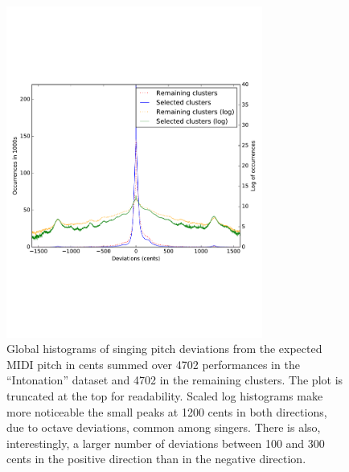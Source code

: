 \begin{figure}[h!]
    \centering
    \includegraphics[width=0.75\textwidth]{figures/full_histograms_comparison.pdf}\vspace{-1in}
    \caption{Global histograms of singing pitch deviations from the expected MIDI pitch in cents summed over 4702 performances in the ``Intonation'' dataset and 4702 in the remaining clusters. The plot is truncated at the top for readability. Scaled log histograms make more noticeable the small peaks at 1200 cents in both directions, due to octave deviations, common among singers. There is also, interestingly, a larger number of deviations between 100 and 300 cents in the positive direction than in the negative direction.}
    \label{fig:full_hist}
\end{figure}

